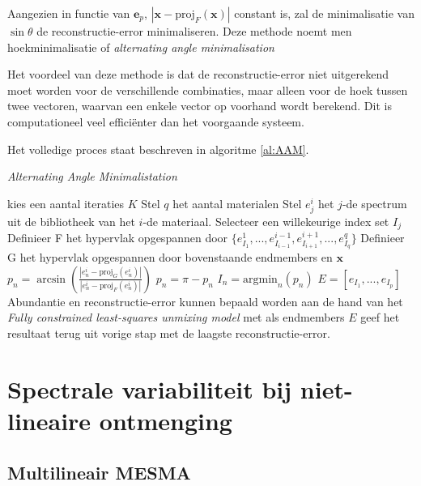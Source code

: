 \documentclass[12pt]{report}
\newcommand{\proj}[2]{\text{proj}_{#2}\left(#1\right)}
\begin{document}
Aangezien in functie van $\bm{e}_p$, $\left| \bm{x} - \proj{\bm{x}}{F}\right|$ constant is, zal de minimalisatie van $\sin \theta$ de reconstructie-error minimaliseren. Deze methode noemt men hoekminimalisatie of \textit{alternating angle minimalisation}

Het voordeel van deze methode is dat de reconstructie-error niet uitgerekend moet worden voor de verschillende combinaties, maar alleen voor de hoek tussen twee vectoren, waarvan een enkele vector op voorhand wordt berekend. Dit is computationeel veel effici\"enter dan het voorgaande systeem.

\vspace{5 mm}

Het volledige proces staat beschreven in algoritme \ref{al:AAM}.

\begin{algorithm}
\caption{\textit{Alternating Angle Minimalistation} \label{al:AAM}}
\begin{algorithmic}[1]
\State kies een aantal iteraties $K$
\State Stel $q$ het aantal materialen
\State Stel $e_j^i$ het $j$-de spectrum uit de bibliotheek van het $i$-de materiaal.
\State Selecteer een willekeurige index set $I_j$
\State Definieer F het hypervlak opgespannen door $\{e^1_{I_1},...,e^{i-1}_{I_{i-1}},e^{i+1}_{I_{i+1}},...,e^q_{I_q}\}$
\State Definieer G het hypervlak opgespannen door bovenstaande endmembers en $\bm{x}$
\State $p_n = \arcsin \left(\frac{\left|e^i_n - \proj{e^i_n}{G}\right|}{\left|e^i_n - \proj{e^i_n}{F}\right|}\right)$
\If {$(e^i_n - \proj{e^i_n}{F}) \dot (x - proj{x}{F}) < 0$}
\State $p_n = \pi - p_n$
\EndIf
\EndFor
\EndFor
\State $I_n = \text{argmin}_n\left(p_n\right)$
\EndFor
\State $E = [e_{I_1},...,e_{I_p}]$
\State Abundantie en reconstructie-error kunnen bepaald worden aan de hand van het \textit{Fully constrained
least-squares unmixing model} met als endmembers $E$
\EndFor
\State geef het resultaat terug uit vorige stap met de laagste reconstructie-error.
\end{algorithmic}
\end{algorithm}


\chapter{Spectrale variabiliteit bij niet-lineaire ontmenging}

\section{Multilineair MESMA} \label{sec:mmesma}
\end{document}
